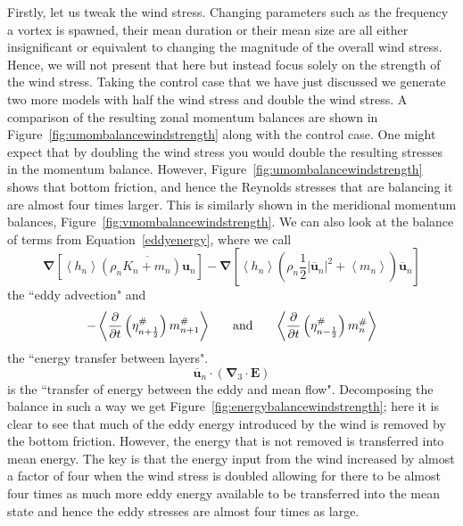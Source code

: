 \documentclass[12pt,a4paper]{report}
\newcommand*\thkmean[1]{\overline{#1}}
\newcommand*\nthkmean[1]{\left\langle{#1}\right\rangle}
\newcommand*\nthkres[1]{{#1}^{\#}}
\newcommand*\figref[1]{Figure~\ref{#1}}
\newcommand*\equref[1]{Equation~\eqref{#1}}
\newcommand*{\half}{\frac{1}{2}}
\begin{document}
 	Firstly, let us tweak the wind stress. Changing parameters such as the 
 	frequency a vortex is spawned, their mean duration or their mean size are all
 	either insignificant or equivalent to changing the magnitude of the overall
 	wind stress. Hence, we will not present that here but instead focus solely on the
 	strength of the wind stress. Taking the control case that we have just discussed
 	we generate two more models with half the wind stress and double the wind stress.
 	A comparison of the resulting zonal momentum balances are shown in \figref{fig:umombalancewindstrength} along with the control case. One might
 	expect that by doubling the wind stress you would double the resulting 
 	stresses in the momentum balance. However, \figref{fig:umombalancewindstrength}
 	shows that bottom friction, and hence the Reynolds stresses that are balancing it
 	are almost four times larger. This is similarly shown in the meridional momentum
 	balances, \figref{fig:vmombalancewindstrength}. We can also look at the balance
 	of terms from \equref{eddyenergy}, where we call
 	\begin{equation*}
 	\boldsymbol{\nabla} \left[\nthkmean{h_{n}} \thkmean{\left(\rho_{n}K_{n}+m_{n}\right) \boldsymbol{u}_{n}}\right] -\boldsymbol{\nabla} \left[\nthkmean{h_{n}} \left(\rho_{n}\half \left|\thkmean{\boldsymbol{u}}_{n}\right|^{2}+\nthkmean{m_{n}}\right) \thkmean{\boldsymbol{u}}_{n}\right]
 	\end{equation*}
 	the ``eddy advection" and
 	\begin{equation*}
 	- \nthkmean{\frac{\partial}{\partial t}\left(\nthkres{\eta}_{n+\half }\right)   \nthkres{m}_{n+1}}
 	\mbox{\hspace{5mm} and \hspace{5mm}} \nthkmean{\frac{\partial}{\partial t}\left(\nthkres{\eta}_{n-\half }\right) \nthkres{m}_{n}}
 	\end{equation*}
 	the ``energy transfer between layers". 
 	\begin{equation*}
 	\thkmean{\boldsymbol{u}}_{n} \cdot \left(\boldsymbol{\nabla}_{3}\cdot \boldsymbol{E}\right)
 	\end{equation*}
 	is the ``transfer of energy between the eddy and mean flow".
 	Decomposing the balance in such a way
 	 we get \figref{fig:energybalancewindstrength}; here it is
 	clear to see that much of the eddy energy introduced by the wind
 	is removed by the bottom friction. However, the energy that is not 
 	removed is transferred into mean energy. The key is that the energy
 	input from the wind increased by almost a factor of four when the wind
 	stress is doubled allowing for there to be
 	almost four times as much more eddy energy available to be transferred into the
 	mean state and hence the eddy stresses are  almost four times as large.
\end{document}
